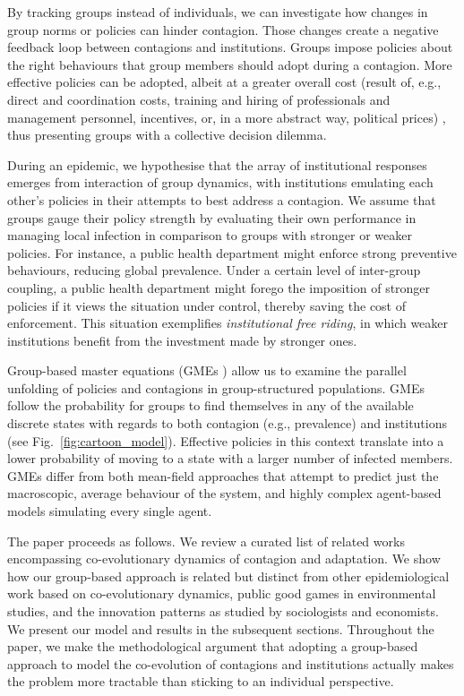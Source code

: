 By tracking groups instead of individuals, we can investigate how changes in group norms or policies can hinder contagion. Those changes create a negative feedback loop between contagions and institutions. Groups impose policies about the right behaviours that group members should adopt during a contagion. More effective policies can be adopted, albeit at a greater overall cost (result of, e.g., direct and coordination costs, training and hiring of professionals and management personnel, incentives, or, in a more abstract way, political prices) \cite{johns_costs_2005}, thus presenting groups with a collective decision dilemma. 

During an epidemic, we hypothesise that the array of institutional responses emerges from interaction of group dynamics, with institutions emulating each other's policies in their attempts to best address a contagion. We assume that groups gauge their policy strength by evaluating their own performance in managing local infection in comparison to groups with stronger or weaker policies. For instance, a public health department might enforce strong preventive behaviours, reducing global prevalence. Under a certain level of inter-group coupling, a public health department might forego the imposition of stronger policies if it views the situation under control, thereby saving the cost of enforcement. This situation exemplifies \textit{institutional free riding}, in which weaker institutions benefit from the investment made by stronger ones.

Group-based master equations (GMEs \cite{hebert-dufresne_propagation_2010,st-onge_master_2021,hebert-dufresne_source-sink_2022}) allow us to examine the parallel unfolding of policies and contagions in group-structured populations. GMEs follow the probability for groups to find themselves in any of the available discrete states with regards to both contagion (e.g., prevalence) and institutions (see Fig.~\ref{fig:cartoon_model}). Effective policies in this context translate into a lower probability of moving to a state with a larger number of infected members. GMEs differ from both mean-field approaches that attempt to predict just the macroscopic, average behaviour of the system, and highly complex agent-based models simulating every single agent.

The paper proceeds as follows. We review a curated list of related works encompassing co-evolutionary dynamics of contagion and adaptation. We show how our group-based approach is related but distinct from other epidemiological work based on co-evolutionary dynamics, public good games in environmental studies, and the innovation patterns as studied by sociologists and economists. We present our model and results in the subsequent sections. Throughout the paper, we make the methodological argument that adopting a group-based approach to model the co-evolution of contagions and institutions actually makes the problem more tractable than sticking to an individual perspective. 

